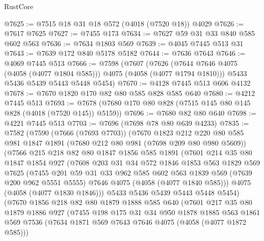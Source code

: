 \begin{lexlean}{RustCore}
\begin{coremodule}
@7625 := @7515 @18 @31 @18 @572 (@4018 (@7520 @18)) @4029
@7626 := @7617 @7625
@7627 := @7455 @173
@7634 := @7627 @59 @31 @33 @840 @585 @602 @563
@7636 := @7634 @1803 @569
@7639 := @4045 @7445 @513 @31
@7643 := @7639 @172 @840 @5178 @5182
@7644 := @7636 @7643
@7646 := @4069 @7445 @513
@7666 := @7598
    (@7607
      (@7626 (@7644 @7646 @4075 (@4058 (@4077 @1804 @585))) @4075 (@4058 (@4077 @1794 @1810)))
      @5433
      @5436
      @5439
      @5443
      @5448
      @5454)
@7670 := @4128 @7445 @513 @606 @4132
@7678 := @7670 @1820 @170 @82 @80 @585 @828 @585 @640
@7680 := @4212 @7445 @513
@7693 := @7678 (@7680 @170 @80 @828 (@7515 @145 @80 @145 @828 (@4018 (@7520 @145)) @5159))
@7696 := @7680 @82 @80 @640
@7698 := @4221 @7445 @513
@7703 := @7696 (@7698 @78 @80 @639 @4233)
@7835 := @7582
    (@7590
      (@7666 (@7693 @7703))
      (@7670
        @1823
        @212
        @220
        @80
        @585
        @981
        @1847
        @1891
        (@7680 @212 @80 @981 (@7698 @209 @80 @980 @5609))
        (@7566
          @215
          @218
          @82
          @80
          @1847
          @1856
          @585
          @1891
          (@7601
            @214
            @35
            @80
            @1847
            @1854
            @927
            (@7608
              @203
              @31
              @34
              @572
              @1846
              @1853
              @563
              @1829
              @569
              @7625
              (@7455
                @201
                @59
                @31
                @33
                @962
                @585
                @602
                @563
                @1839
                @569
                (@7639 @200 @962 @5551 @5555)
                @7646
                @4075
                (@4058 (@4077 @1840 @585)))
              @4075
              (@4058 (@4077 @1830 @1846)))
            @5433
            @5436
            @5439
            @5443
            @5448
            @5454)
          (@7670
            @1856
            @218
            @82
            @80
            @1879
            @1888
            @585
            @640
            (@7601
              @217
              @35
              @80
              @1879
              @1886
              @927
              (@7455
                @198
                @175
                @31
                @34
                @950
                @1878
                @1885
                @563
                @1861
                @569
                @7536
                (@7634 @1871 @569 @7643 @7646 @4075 (@4058 (@4077 @1872 @585)))

\end{coremodule}
\end{lexlean}
